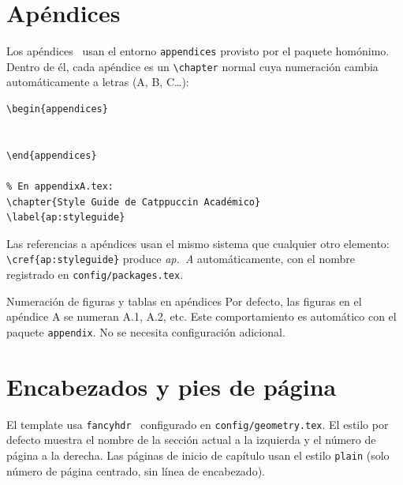 \section{Apéndices}
\label{sec:apendices}

Los apéndices~\cite{appendix2020} usan el entorno \texttt{appendices}
provisto por el paquete homónimo. Dentro de él, cada apéndice es un
\texttt{\textbackslash chapter} normal cuya numeración cambia
automáticamente a letras (A, B, C\ldots):

\begin{lstlisting}[style=latex, frame=none, numbers=none]
% En main.tex, después de los capítulos:
\begin{appendices}
  
  
\end{appendices}

% En appendixA.tex:
\chapter{Style Guide de Catppuccin Académico}
\label{ap:styleguide}
\end{lstlisting}

Las referencias a apéndices usan el mismo sistema que cualquier otro
elemento: \texttt{\textbackslash cref\{ap:styleguide\}} produce
\textit{ap.~A} automáticamente, con el nombre registrado en
\texttt{config/packages.tex}.

\begin{observacion}{Numeración de figuras y tablas en apéndices}
Por defecto, las figuras en el apéndice A se numeran A.1, A.2, etc.
Este comportamiento es automático con el paquete \texttt{appendix}.
No se necesita configuración adicional.
\end{observacion}

\section{Encabezados y pies de página}
\label{sec:headers}

El template usa \texttt{fancyhdr}~\cite{fancyhdr2022} configurado en
\texttt{config/geometry.tex}. El estilo por defecto muestra el nombre de
la sección actual a la izquierda y el número de página a la derecha.
Las páginas de inicio de capítulo usan el estilo \texttt{plain}
(solo número de página centrado, sin línea de encabezado).

